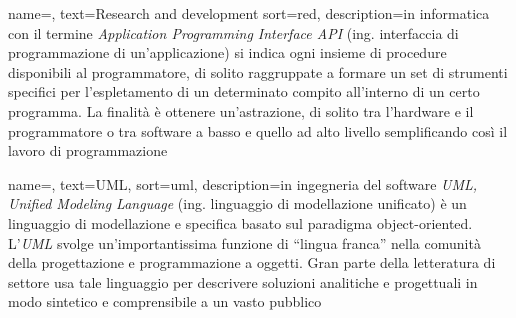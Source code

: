 
\renewcommand{\acronymname}{Acronimi e abbreviazioni}






\renewcommand{\glossaryname}{Glossario}

{
    name=,
    text=Research and development
    sort=red,
    description={in informatica con il termine \emph{Application Programming Interface API} (ing. interfaccia di programmazione di un'applicazione) si indica ogni insieme di procedure disponibili al programmatore, di solito raggruppate a formare un set di strumenti specifici per l'espletamento di un determinato compito all'interno di un certo programma. La finalità è ottenere un'astrazione, di solito tra l'hardware e il programmatore o tra software a basso e quello ad alto livello semplificando così il lavoro di programmazione}
}

{
    name=,
    text=UML,
    sort=uml,
    description={in ingegneria del software \emph{UML, Unified Modeling Language} (ing. linguaggio di modellazione unificato) è un linguaggio di modellazione e specifica basato sul paradigma object-oriented. L'\emph{UML} svolge un'importantissima funzione di ``lingua franca'' nella comunità della progettazione e programmazione a oggetti. Gran parte della letteratura di settore usa tale linguaggio per descrivere soluzioni analitiche e progettuali in modo sintetico e comprensibile a un vasto pubblico}
}

